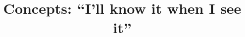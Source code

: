 
\usepackage{tikz}
\usetikzlibrary{shapes,arrows}

\title{Concepts: ``I'll know it when I see it''}


\date[]{}



\frame{\titlepage}

\frame{\tableofcontents}


\frame{\tableofcontents[currentsection]}




\appendix
\frame{}


